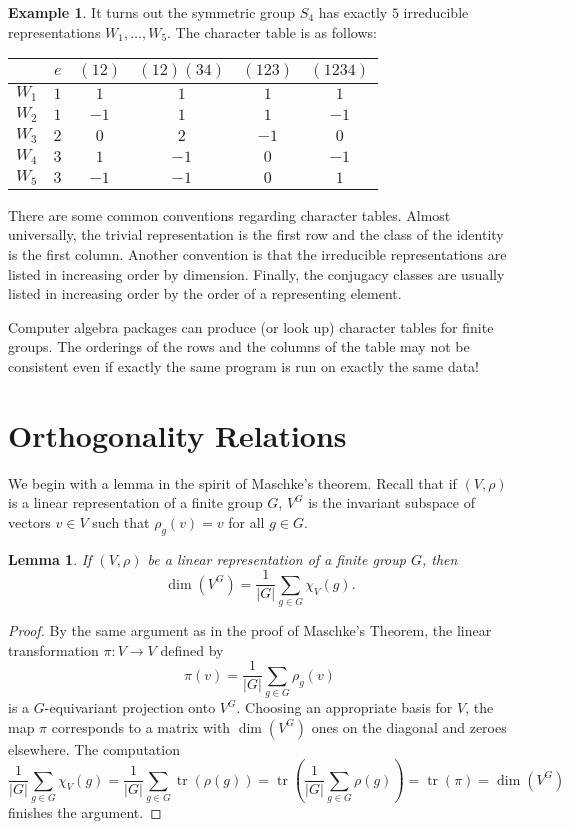 \documentclass[12pt]{article}
\theoremstyle{plain}
\newtheorem{lemma}[theorem]{Lemma}
\theoremstyle{definition}
\newtheorem{example}[theorem]{Example}
\theoremstyle{remark}
\numberwithin{equation}{section}
\begin{document}
\begin{example}
It turns out the symmetric group $S_4$ has exactly $5$ irreducible
representations $W_1, \ldots, W_5$.
The character table is as follows:
\begin{center}
\begin{tabular}{|c|c|c|c|c|c|}
\hline 
 & $e $ & $(12)$ & $(12)(34)$ & $(123)$ & $(1234)$\\
\hline 
\hline 
$W_1$ & $1$ & $1$ & $1$ & $1$ & $1$\\
\hline 
$W_2$ & $1$ & $-1$ & $1$ & $1$ & $-1$\\
\hline 
$W_3$ & $2$ & $0$ & $2$ & $-1$ & $0$\\
\hline 
$W_4$ & $3$ & $1$ & $-1$ & $0$ & $-1$\\
\hline 
$W_5$ & $3$ & $-1$ & $-1$ & $0$ & $1$\\
\hline 
\end{tabular}
\end{center}
\end{example}

There are some common conventions regarding character tables.
Almost universally,
the trivial representation is the first row and the class of the
identity is the first column.
Another convention is that the irreducible representations are listed in
increasing order by dimension.
Finally, the conjugacy classes are usually listed in increasing order by
the order of a representing element.

Computer algebra packages can produce (or look up) character tables
for finite groups.  The orderings of the rows and the columns of the
table may not be consistent even if exactly the same program is run on
exactly the same data!

\section{Orthogonality Relations}

We begin with a lemma in the spirit of Maschke's theorem.
Recall that if $(V,\rho)$ is a linear representation of a finite group $G$,
$V^G$ is the invariant subspace of vectors
$v \in V$ such that $\rho_g(v)=v$ for all $g \in G$.

\begin{lemma}
If $(V,\rho)$ be a linear representation of a finite group $G$,
then
\[ \dim(V^G) = \frac{1}{|G|} \sum_{g \in G} \chi_V(g). \]
\end{lemma}

\begin{proof}
By the same argument as in the proof of Maschke's Theorem,
the linear transformation $\pi : V \to V$ defined by
\[
\pi(v) = \frac{1}{|G|} \sum_{g \in G} \rho_g(v)
\]
is a $G$-equivariant projection onto $V^G$.
Choosing an appropriate basis for $V$, the map $\pi$ corresponds to a
matrix with $\dim(V^G)$ ones on the diagonal and zeroes elsewhere.
The computation
\[
\frac{1}{|G|} \sum_{g \in G} \chi_V(g)
= \frac{1}{|G|} \sum_{g \in G} \operatorname{tr}( \rho(g) )
= \operatorname{tr}\left( \frac{1}{|G|} \sum_{g \in G}\rho(g) \right)
= \operatorname{tr}( \pi ) = \dim(V^G)
\]
finishes the argument.
\end{proof}
\end{document}

